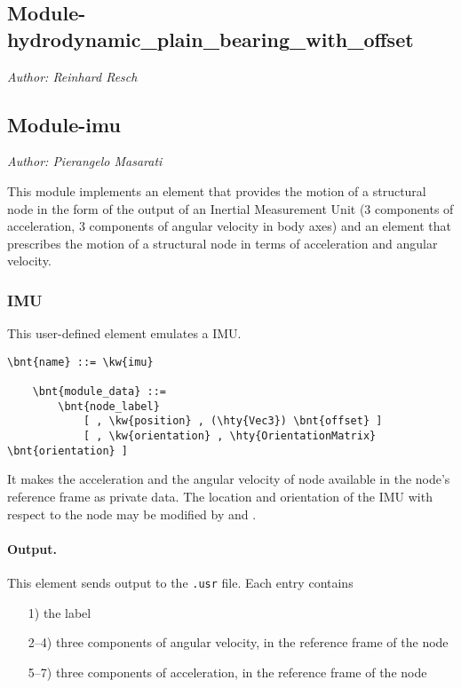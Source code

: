 \subsection{Module-hydrodynamic\_plain\_bearing\_with\_offset}
\emph{Author: Reinhard Resch}




\subsection{Module-imu}
\emph{Author: Pierangelo Masarati}

\noindent
This module implements an element that provides the motion of a structural node
in the form of the output of an Inertial Measurement Unit
(3 components of acceleration, 3 components of angular velocity in body axes)
and an element that prescribes the motion of a structural node
in terms of acceleration and angular velocity.

\subsubsection{IMU}
This user-defined element emulates a IMU.
\begin{Verbatim}[commandchars=\\\{\}]
    \bnt{name} ::= \kw{imu}

    \bnt{module_data} ::=
        \bnt{node_label}
            [ , \kw{position} , (\hty{Vec3}) \bnt{offset} ]
            [ , \kw{orientation} , \hty{OrientationMatrix} \bnt{orientation} ]
\end{Verbatim}
It makes the acceleration and the angular velocity of node 
available in the node's reference frame as private data.
The location and orientation of the IMU with respect to the node may be modified
by  and .

\paragraph{Output.}
This element sends output to the \texttt{.usr} file.
Each entry contains
\begin{itemize}
\item[1)] the label
\item[2--4)] three components of angular velocity, in the reference frame of the node
\item[5--7)] three components of acceleration, in the reference frame of the node
\end{itemize}

